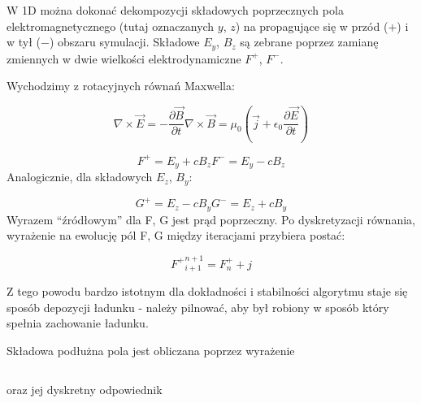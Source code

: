 W 1D można dokonać dekompozycji składowych poprzecznych pola elektromagnetycznego (tutaj oznaczanych $y$, $z$) na
propagujące się w przód ($+$) i w tył ($-$) obszaru symulacji. Składowe $E_y$, $B_z$ są zebrane poprzez zamianę zmiennych
w dwie wielkości elektrodynamiczne $F^+$, $F^-$. 

Wychodzimy z rotacyjnych równań Maxwella:

\begin{equation}
    \nabla \times \vec{E} = -\frac{\partial \vec{B}}{\partial t}
    \nabla \times \vec{B} = \mu_0 (\vec{j} + \epsilon_0 \frac{\partial \vec{E}}{\partial t})
    \label{eqn:Maxwell-rotation-derivation}
\end{equation}


\begin{equation}
    F^{+} = E_y + c B_z
    F^{-} = E_y - c B_z
    \label{eqn:Birdsall-electromagnetic-quantities}
\end{equation}
Analogicznie, dla składowych $E_z$, $B_y$:

\begin{equation}
    G^{+} = E_z - c B_y
    G^{-} = E_z + c B_y
    \label{eqn:Birdsall-electromagnetic-quantities-alternate-axes}
\end{equation}
Wyrazem ``źródłowym'' dla F, G jest prąd poprzeczny. Po dyskretyzacji równania, wyrażenie na ewolucję pól F, G między
iteracjami przybiera postać:

\begin{equation}
    {F^{+}}^{n+1}_{i+1} = F^{+}_{n} + j%
\end{equation}

Z tego powodu bardzo istotnym dla dokładności i stabilności algorytmu staje się sposób depozycji ładunku - należy pilnować,
aby był robiony w sposób który spełnia zachowanie ładunku.

Składowa podłużna pola jest obliczana poprzez wyrażenie

\begin{equation}
\end{equation}

oraz jej dyskretny odpowiednik

